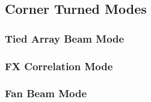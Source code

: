 \subsection{Corner Turned Modes}
\subsubsection{Tied Array Beam Mode}
\subsubsection{FX Correlation Mode}
\subsubsection{Fan Beam Mode}
